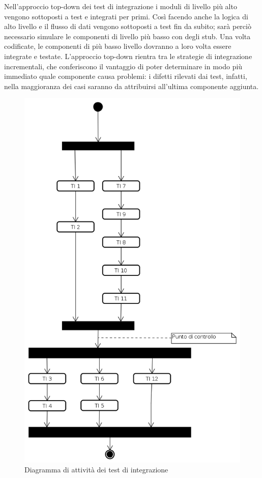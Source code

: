 Nell'approccio top-down dei test di integrazione i moduli di livello più alto vengono sottoposti a test e integrati per primi. Così facendo anche la logica di alto livello e il flusso di dati vengono sottoposti a test fin da subito; sarà perciò necessario simulare le componenti di livello più basso con degli stub. Una volta codificate, le componenti di più basso livello dovranno a loro volta essere integrate e testate. L'approccio top-down rientra tra le strategie di integrazione incrementali, che conferiscono il vantaggio di poter determinare in modo più immediato quale componente causa problemi: i difetti rilevati dai test, infatti, nella maggioranza dei casi saranno da attribuirsi all'ultima componente aggiunta.
\begin{figure}[ht]
	\centering
	\includegraphics[scale=0.45]{DiagrammaDiAttivita.png}
	\caption{Diagramma di attività dei test di integrazione}
\end{figure}
\FloatBarrier